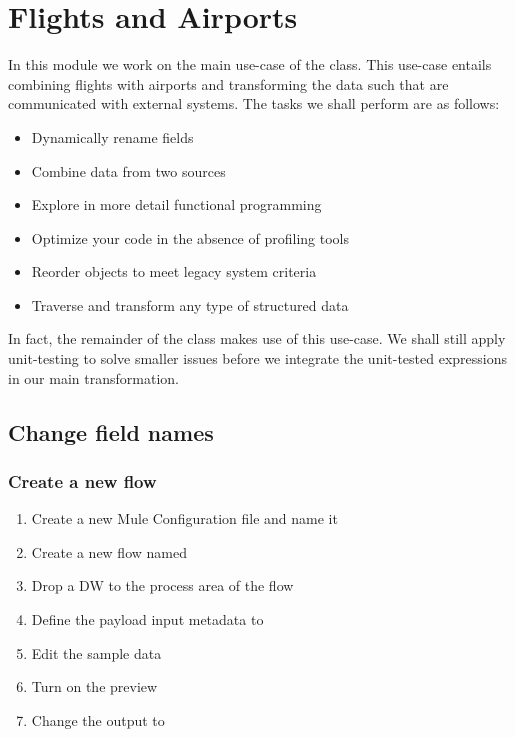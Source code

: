 \chapter{Flights and Airports}

In this module we work on the main use-case of the class.  This use-case entails combining flights with airports and transforming the data such that are communicated with external systems. The tasks we shall perform are as follows:
\begin{itemize}
\item Dynamically rename fields
\item Combine data from two sources
\item Explore in more detail functional programming
\item Optimize your code in the absence of profiling tools
\item Reorder objects to meet legacy system criteria
\item Traverse and transform any type of structured data
\end{itemize}
In fact, the remainder of the class makes use of this use-case.  We shall still apply unit-testing to solve smaller issues before we integrate the unit-tested expressions in our main transformation. 

\section{Change field names}

\subsection{Create a new flow}
\begin{enumerate}
\item Create a new Mule Configuration file and name it 
\item Create a new flow named 
\item Drop a DW to the process area of the flow
\item Define the payload input metadata to  
\item Edit the sample data
\item Turn on the preview
\item Change the output to 
\end{enumerate}

